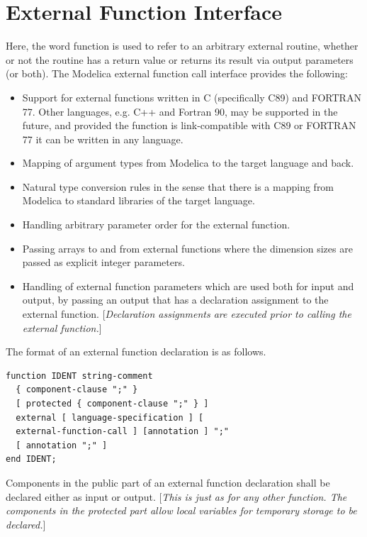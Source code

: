 \documentclass[10pt,a4paper]{report}
\def\doublelabel#1{\label{#1}\hypertarget{#1}{}}
\begin{document}
\section{External Function Interface}\doublelabel{external-function-interface}

Here, the word function is used to refer to an arbitrary external
routine, whether or not the routine has a return value or returns its
result via output parameters (or both). The Modelica external function
call interface provides the following:

\begin{itemize}
\item
  Support for external functions written in C (specifically C89) and
  FORTRAN 77. Other languages, e.g. C++ and Fortran 90, may be supported
  in the future, and provided the function is link-compatible with C89
  or FORTRAN 77 it can be written in any language.
\item
  Mapping of argument types from Modelica to the target language and
  back.
\item
  Natural type conversion rules in the sense that there is a mapping
  from Modelica to standard libraries of the target language.
\item
  Handling arbitrary parameter order for the external function.
\item
  Passing arrays to and from external functions where the dimension
  sizes are passed as explicit integer parameters.
\item
  Handling of external function parameters which are used both for input
  and output, by passing an output that has a declaration assignment to
  the external function. {[}\emph{Declaration assignments are executed
  prior to calling the external function.}{]}
\end{itemize}

The format of an external function declaration is as follows.

\begin{lstlisting}[language=grammar]
function IDENT string-comment
  { component-clause ";" }
  [ protected { component-clause ";" } ]
  external [ language-specification ] [
  external-function-call ] [annotation ] ";"
  [ annotation ";" ]
end IDENT;
\end{lstlisting}
Components in the public part of an external function declaration shall
be declared either as input or output. {[}\emph{This is just as for any
other function. The components in the protected part allow local
variables for temporary storage to be declared.}{]}
\end{document}
